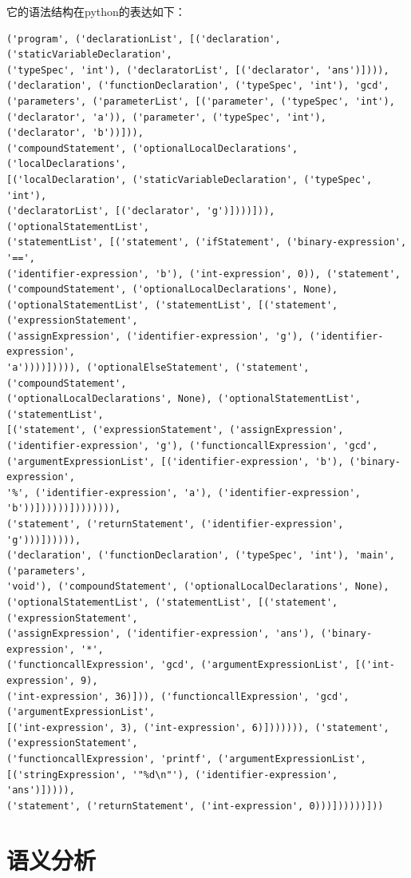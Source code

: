 \documentclass{article}
\begin{document}
它的语法结构在python的表达如下：

\begin{verbatim}
('program', ('declarationList', [('declaration', ('staticVariableDeclaration',
('typeSpec', 'int'), ('declaratorList', [('declarator', 'ans')]))),
('declaration', ('functionDeclaration', ('typeSpec', 'int'), 'gcd', 
('parameters', ('parameterList', [('parameter', ('typeSpec', 'int'), 
('declarator', 'a')), ('parameter', ('typeSpec', 'int'), ('declarator', 'b'))])), 
('compoundStatement', ('optionalLocalDeclarations', ('localDeclarations', 
[('localDeclaration', ('staticVariableDeclaration', ('typeSpec', 'int'), 
('declaratorList', [('declarator', 'g')])))])), ('optionalStatementList', 
('statementList', [('statement', ('ifStatement', ('binary-expression', '==', 
('identifier-expression', 'b'), ('int-expression', 0)), ('statement', 
('compoundStatement', ('optionalLocalDeclarations', None), 
('optionalStatementList', ('statementList', [('statement', ('expressionStatement', 
('assignExpression', ('identifier-expression', 'g'), ('identifier-expression', 
'a'))))])))), ('optionalElseStatement', ('statement', ('compoundStatement', 
('optionalLocalDeclarations', None), ('optionalStatementList', ('statementList', 
[('statement', ('expressionStatement', ('assignExpression', 
('identifier-expression', 'g'), ('functioncallExpression', 'gcd', 
('argumentExpressionList', [('identifier-expression', 'b'), ('binary-expression', 
'%', ('identifier-expression', 'a'), ('identifier-expression', 'b'))])))))]))))))), 
('statement', ('returnStatement', ('identifier-expression', 'g')))]))))), 
('declaration', ('functionDeclaration', ('typeSpec', 'int'), 'main', ('parameters', 
'void'), ('compoundStatement', ('optionalLocalDeclarations', None), 
('optionalStatementList', ('statementList', [('statement', ('expressionStatement', 
('assignExpression', ('identifier-expression', 'ans'), ('binary-expression', '*', 
('functioncallExpression', 'gcd', ('argumentExpressionList', [('int-expression', 9), 
('int-expression', 36)])), ('functioncallExpression', 'gcd', ('argumentExpressionList', 
[('int-expression', 3), ('int-expression', 6)])))))), ('statement', ('expressionStatement', 
('functioncallExpression', 'printf', ('argumentExpressionList', 
[('stringExpression', '"%d\n"'), ('identifier-expression', 'ans')])))), 
('statement', ('returnStatement', ('int-expression', 0)))])))))]))

\end{verbatim}

\section{语义分析}
\end{document}
